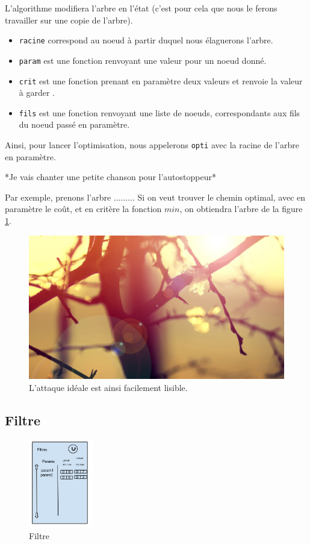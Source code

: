 		L'algorithme modifiera l'arbre en l'état (c'est pour cela que nous le ferons travailler sur une copie de l'arbre).
		\begin{itemize}
			\item \verb|racine| correspond au noeud à partir duquel nous élaguerons l'arbre.
			\item \verb|param| est une fonction renvoyant une valeur pour un noeud donné.
			\item \verb|crit| est une fonction prenant en paramètre deux valeurs et renvoie la valeur à \og garder \fg.
			\item \verb|fils| est une fonction renvoyant une liste de noeuds, correspondants aux fils du noeud passé en paramètre.
		\end{itemize}
		Ainsi, pour lancer l'optimisation, nous appelerons \verb|opti| avec la racine de l'arbre en paramètre.

		*Je vais chanter une petite chanson pour l'autostoppeur*

		Par exemple, prenons l'arbre .........
		Si on veut trouver le chemin optimal, avec en paramètre le coût, et en critère la fonction $min$, on obtiendra l'arbre de la figure \ref{fig:arbre_post_opti}.

		\begin{figure}
			\centering
			\includegraphics[width=1\textwidth]{figure/arbre_post_opti.jpg}
			\caption{L'attaque idéale est ainsi facilement lisible.}
			\label{fig:arbre_post_opti}
		\end{figure}


	\subsection{Filtre}
		\begin{figure}
			\begin{center}
				\includegraphics[width=0.25\textwidth]{figure/filtre.png}
			\end{center}
			\caption{Filtre}
			\label{fig:filtre}
		\end{figure}

